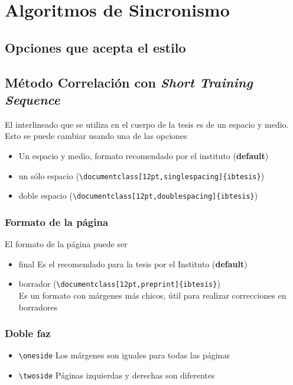 \chapter{Algoritmos de Sincronismo}

\section{Opciones que acepta el estilo}
\label{S:opciones-que-acepta}

\section{Método Correlación con \textit{Short Training Sequence}}
\label{S:cor_sts}
El interlineado que se utiliza en el cuerpo de la tesis es de un espacio y medio. Esto se puede cambiar usando una de las opciones
\begin{itemize}
\item Un espacio y medio, formato recomendado por el instituto (\textbf{default})
\item un s\'{o}lo espacio (\verb|\documentclass[12pt,singlespacing]{ibtesis}|) 
\item doble espacio (\verb|\documentclass[12pt,doublespacing]{ibtesis}|)
\end{itemize}

\subsection*{Formato de la p\'{a}gina}
El formato de la p\'{a}gina puede ser
\begin{itemize}
\item final Es el recomendado para la tesis por el Instituto (\textbf{default})
\item borrador (\verb|\documentclass[12pt,preprint]{ibtesis}|)\\ Es un formato con m\'{a}rgenes m\'{a}s chicos, \'{u}til para realizar correcciones en borradores 
\end{itemize}

\subsection*{Doble faz}
\label{S:doble-faz}

\begin{itemize}
\item \verb|\oneside| Los m\'{a}rgenes son iguales para todas las p\'{a}ginas
\item \verb|\twoside| P\'{a}ginas izquierdas y derechas son diferentes
\end{itemize}

